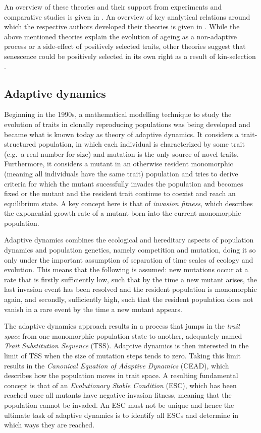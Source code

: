 \documentclass[11pt, a4paper]{article}
\theoremstyle{definition}
\begin{document}
    An overview of these theories and their support from experiments and comparative studies is given in \autocite{kirkwood2000age}. An overview of key analytical relations around which the respective authors developed their theories is given in \autocite{charlesworth2000fisher}. While the above mentioned theories explain the evolution of ageing as a non-adaptive process or a side-effect of positively selected traits, other theories suggest that senescence could be positively selected in its own right as a result of kin-selection \autocite{longo2005programmed, lohr2019does}.

\subsection{Adaptive dynamics}
    Beginning in the 1990s, a mathematical modelling technique to study the evolution of traits in clonally reproducing populations was being developed and became what is known today as theory of adaptive dynamics. It considers a trait-structured population, in which each individual is characterized by some trait (e.g.\ a real number for size) and mutation is the only source of novel traits. Furthermore, it considers a mutant in an otherwise resident monomorphic (meaning all individuals have the same trait) population and tries to derive criteria for which the mutant sucessfully invades the population and becomes fixed or the mutant and the resident trait continue to coexist and reach an equilibrium state. 
    A key concept here is that of \emph{invasion fitness}, which describes the exponential growth rate of a mutant born into the current monomorphic population.

    Adaptive dynamics combines the ecological and hereditary aspects of population dynamics and population genetics, namely competition and mutation, doing it so only under the important assumption of separation of time scales of ecology and evolution. 
    This means that the following is assumed: new mutations occur at a rate that is firstly sufficiently low, such that by the time a new mutant arises, the last invasion event has been resolved and the resident population is monomorphic again, and secondly, sufficiently high, such that the resident population does not vanish in a rare event by the time a new mutant appears.

    The adaptive dynamics approach results in a process that jumps in the \emph{trait space} from one monomorphic population state to another, adequately named \emph{Trait Substitution Sequence} (TSS). Adaptive dynamics is then interested in the limit of TSS when the size of mutation steps tends to zero. Taking this limit results in the \emph{Canonical Equation of Adaptive Dynamics} (CEAD), which describes how the population moves in trait space. A resulting fundamental concept is that of an \emph{Evolutionary Stable Condition} (ESC), which has been reached once all mutants have negative invasion fitness, meaning that the population cannot be invaded. An ESC must not be unique and hence the ultimate task of adaptive dynamics is to identify all ESCs and determine in which ways they are reached.
\end{document}

